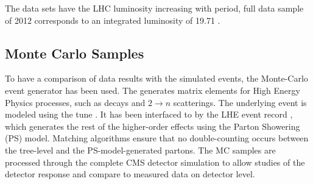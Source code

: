 The data sets have the LHC luminosity increasing with period, full data sample of 2012 corresponds to an integrated luminosity of 19.71 \fbinv. 

\subsection{Monte Carlo Samples}
To have a comparison of data results with the simulated events, the \MadGraphF \cite{Alwall:2011uj} Monte-Carlo event generator has been used. The \MadGraphF generates matrix elements for High Energy Physics processes, such as decays and $2 \rightarrow n$ scatterings. The underlying event is modeled using the tune \Ztwostar. It has been interfaced to \PYTHIAS \cite{Sjostrand:2006za} by the LHE event record \cite{Alwall:2006yp}, which generates the rest of the higher-order effects using the Parton Showering (PS) model. Matching algorithms ensure that no double-counting occurs between the tree-level and the PS-model-generated partons. The MC samples are processed through the complete CMS detector simulation to allow studies of the detector response and compare to measured data on detector level.

